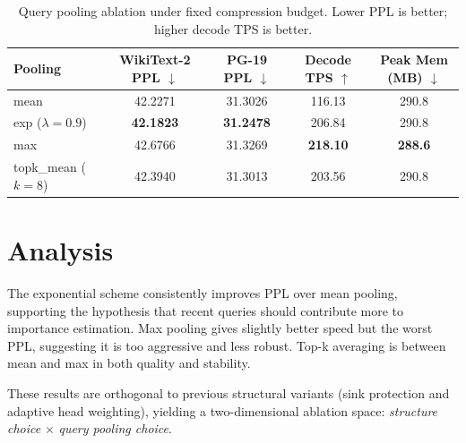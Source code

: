 \documentclass{article}
\begin{document}
\begin{table}[h]
\centering
\caption{Query pooling ablation under fixed compression budget. Lower PPL is better; higher decode TPS is better.}
\begin{tabular}{lcccc}
\toprule
Pooling & WikiText-2 PPL $\downarrow$ & PG-19 PPL $\downarrow$ & Decode TPS $\uparrow$ & Peak Mem (MB) $\downarrow$ \\
\midrule
mean & 42.2271 & 31.3026 & 116.13 & 290.8 \\
exp ($\lambda=0.9$) & \textbf{42.1823} & \textbf{31.2478} & 206.84 & 290.8 \\
max & 42.6766 & 31.3269 & \textbf{218.10} & \textbf{288.6} \\
topk\_mean ($k=8$) & 42.3940 & 31.3013 & 203.56 & 290.8 \\
\bottomrule
\end{tabular}
\end{table}

\section{Analysis}
The exponential scheme consistently improves PPL over mean pooling, supporting the hypothesis that recent queries should contribute more to importance estimation. Max pooling gives slightly better speed but the worst PPL, suggesting it is too aggressive and less robust. Top-k averaging is between mean and max in both quality and stability.

These results are orthogonal to previous structural variants (sink protection and adaptive head weighting), yielding a two-dimensional ablation space: \emph{structure choice} $\times$ \emph{query pooling choice}.
\end{document}
